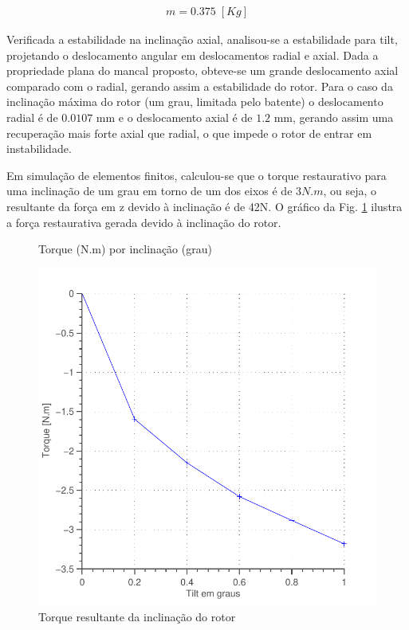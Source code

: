 \begin{align}
	m = 0.375 \; [Kg]
	\label{eq:massa}
\end{align}


Verificada a estabilidade na inclinação axial, analisou-se a estabilidade para tilt, projetando o deslocamento angular em deslocamentos radial e axial. Dada a propriedade plana do mancal proposto, obteve-se um grande deslocamento axial comparado com o radial, gerando assim a estabilidade do rotor. Para o caso da inclinação máxima do rotor (um grau, limitada pelo batente) o deslocamento radial é de $0.0107$ mm e o deslocamento axial é de $1.2$ mm, gerando assim uma recuperação mais forte axial que radial, o que impede o rotor de entrar em instabilidade.

Em simulação de elementos finitos, calculou-se que o torque restaurativo para uma inclinação de um grau em torno de um dos eixos é de $3 N.m$, ou seja, o resultante da força em z devido à inclinação é de 42N. O gráfico da Fig. \ref{fig:passivo:torque:tilt} ilustra a força restaurativa gerada devido à inclinação do rotor.

\begin{figure}[!ht]
\centering
\caption*{Torque (N.m) por inclinação (grau) }
\includegraphics[width=0.7\linewidth]{Figs/Simulacoes/Passivo2/fem/passivo_otimizado_fem_tilt}
\caption{Torque resultante da inclinação do rotor}
\label{fig:passivo:torque:tilt} 
\end{figure}


